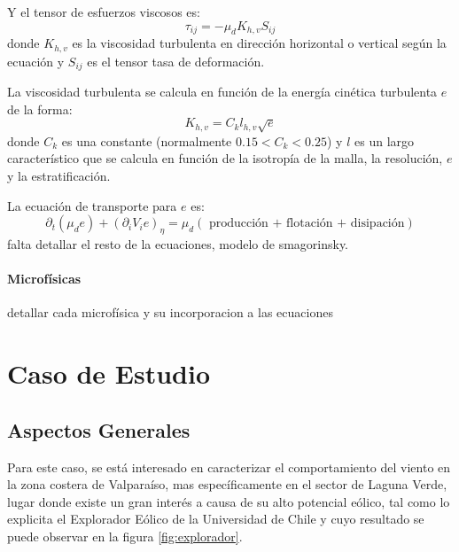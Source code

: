 Y el tensor de esfuerzos viscosos es:
\begin{equation}
\tau_{ij} = -\mu_d K_{h,v}S_{ij}
\end{equation}
donde $K_{h,v}$ es la viscosidad turbulenta en dirección horizontal o vertical según la ecuación y $S_{ij}$ es el tensor tasa de deformación.

La viscosidad turbulenta se calcula en función de la energía cinética turbulenta $e$ de la forma:
\begin{equation}
K_{h,v}=C_k l_{h,v}\sqrt{e}
\end{equation}
donde $C_k$ es una constante (normalmente $0.15<C_k<0.25$) y $l$ es un largo característico que se calcula en función de la isotropía de la malla, la resolución, $e$ y la estratificación.

La ecuación de transporte para $e$ es:
\begin{equation}
\partial_t(\mu_d e) + (\partial_i V_i e)_\eta = \mu_d(\text{ producción + flotación + disipación})
\end{equation}
falta detallar el resto de la ecuaciones, modelo de smagorinsky.
\subsubsection{Microfísicas}
detallar cada microfísica y su incorporacion a las ecuaciones

\chapter{Caso de Estudio}
\section{Aspectos Generales}
Para este caso, se está interesado en caracterizar el comportamiento del viento en la zona costera de Valparaíso, mas específicamente en el sector de Laguna Verde, lugar donde existe un gran interés a causa de su alto potencial eólico, tal como lo explicita el Explorador Eólico de la Universidad de Chile y cuyo resultado se puede observar en la figura \ref{fig:explorador}.


